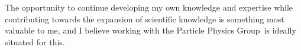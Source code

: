 \documentclass[11pt, a4paper]{awesome-cv}
\newcommand\research{Particle Physics Group}
\begin{document}
\begin{cvletter}
The opportunity to continue developing my own knowledge and expertise while contributing towards the expansion of scientific knowledge is something most valuable to me, and I believe working with the \research~is ideally situated for this. 

\end{cvletter}

\makeletterclosing
\end{document}
